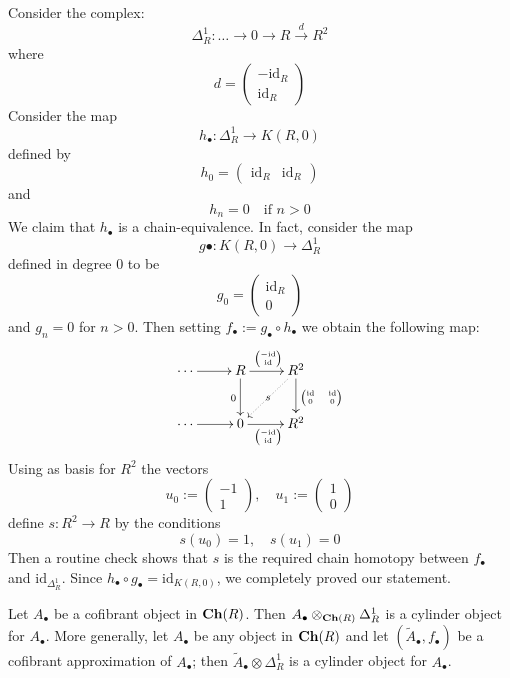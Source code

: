 \begin{refsection}
\begin{eg} \label{eg delta^1 for chain complexes}
Consider the complex:
\[
\Delta^1_R \colon \ldots \to 0 \to R \xrightarrow{d} R^2
\]
where
\[
d = \begin{pmatrix} - \mathrm{id}_R \\ \mathrm{id}_R \end{pmatrix}
\]
Consider the map
\[
h_\bullet \colon \Delta^1_R \to K(R,0)
\]
defined by
\[
h_0 = \begin{pmatrix} \mathrm{id}_R & \mathrm{id}_R \end{pmatrix}
\]
and
\[
h_n = 0 \quad \text{if } n > 0
\]
We claim that $h_\bullet$ is a chain-equivalence. In fact, consider the map
\[
g \bullet \colon K(R,0) \to \Delta^1_R
\]
defined in degree $0$ to be
\[
g_0 = \begin{pmatrix} \mathrm{id}_R \\ 0 \end{pmatrix}
\]
and $g_n = 0$ for $n > 0$. Then setting $f_\bullet := g_\bullet \circ h_\bullet$ we obtain the following map:
\[
\xymatrix{
\cdots \ar[r] & R \ar[d]_0 \ar[r]^{\tiny \begin{pmatrix} - \mathrm{id} \\ \mathrm{id} \end{pmatrix}} & R^2 \ar[d]^{\tiny \begin{pmatrix} \mathrm{id} & \mathrm{id} \\ 0 & 0 \end{pmatrix}} \ar@{.>}[dl]|-s \\ \cdots \ar[r] & 0 \ar[r]_{\tiny \begin{pmatrix} - \mathrm{id} \\ \mathrm{id} \end{pmatrix}} & R^2
}
\]
Using as basis for $R^2$ the vectors
\[
u_0 := \begin{pmatrix}
-1 \\ 1
\end{pmatrix}, \quad u_1 := \begin{pmatrix} 1 \\ 0 \end{pmatrix}
\]
define $s \colon R^2 \to R$ by the conditions
\[
s(u_0) = 1, \quad s(u_1) = 0
\]
Then a routine check shows that $s$ is the required chain homotopy between $f_\bullet$ and $\mathrm{id}_{\Delta^1_R}$. Since $h_\bullet \circ g_\bullet = \mathrm{id}_{K(R,0)}$, we completely proved our statement.
\end{eg}


\begin{lemma}
Let $A_\bullet$ be a cofibrant object in $\mathbf{Ch}(R)$. Then $A_\bullet \otimes_{\mathbf{Ch}(R)} \Delta^1_R$ is a cylinder object for $A_\bullet$. More generally, let $A_\bullet$ be any object in $\mathbf{Ch}(R)$ and let $(\widetilde{A}_\bullet,f_\bullet)$ be a cofibrant approximation of $A_\bullet$; then $\widetilde{A}_\bullet \otimes \Delta^1_R$ is a cylinder object for $A_\bullet$.
\end{lemma}


\end{refsection}
